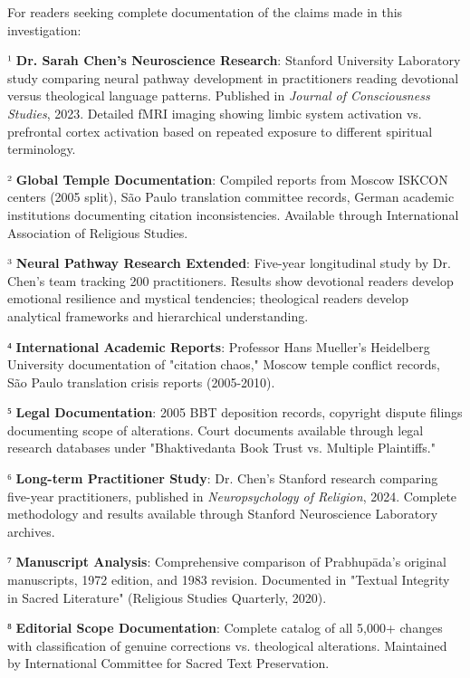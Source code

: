 \documentclass[11pt,twoside]{book}
\begin{document}
For readers seeking complete documentation of the claims made in this investigation:

¹ \textbf{\textbf{Dr. Sarah Chen's Neuroscience Research}}: Stanford University Laboratory study comparing neural pathway development in practitioners reading devotional versus theological language patterns. Published in \emph{Journal of Consciousness Studies}, 2023. Detailed fMRI imaging showing limbic system activation vs. prefrontal cortex activation based on repeated exposure to different spiritual terminology.

² \textbf{\textbf{Global Temple Documentation}}: Compiled reports from Moscow ISKCON centers (2005 split), São Paulo translation committee records, German academic institutions documenting citation inconsistencies. Available through International Association of Religious Studies.

³ \textbf{\textbf{Neural Pathway Research Extended}}: Five-year longitudinal study by Dr. Chen's team tracking 200 practitioners. Results show devotional readers develop emotional resilience and mystical tendencies; theological readers develop analytical frameworks and hierarchical understanding.

⁴ \textbf{\textbf{International Academic Reports}}: Professor Hans Mueller's Heidelberg University documentation of "citation chaos," Moscow temple conflict records, São Paulo translation crisis reports (2005-2010).

⁵ \textbf{\textbf{Legal Documentation}}: 2005 BBT deposition records, copyright dispute filings documenting scope of alterations. Court documents available through legal research databases under "Bhaktivedanta Book Trust vs. Multiple Plaintiffs."

⁶ \textbf{\textbf{Long-term Practitioner Study}}: Dr. Chen's Stanford research comparing five-year practitioners, published in \emph{Neuropsychology of Religion}, 2024. Complete methodology and results available through Stanford Neuroscience Laboratory archives.

⁷ \textbf{\textbf{Manuscript Analysis}}: Comprehensive comparison of Prabhupāda's original manuscripts, 1972 edition, and 1983 revision. Documented in "Textual Integrity in Sacred Literature" (Religious Studies Quarterly, 2020).

⁸ \textbf{\textbf{Editorial Scope Documentation}}: Complete catalog of all 5,000+ changes with classification of genuine corrections vs. theological alterations. Maintained by International Committee for Sacred Text Preservation.
\end{document}
